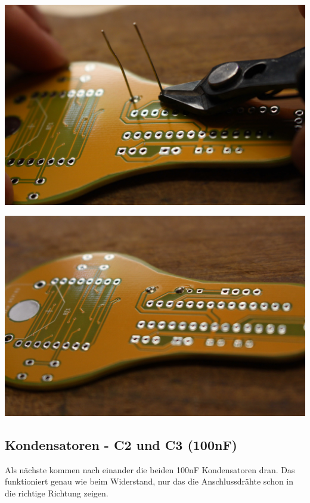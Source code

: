 \documentclass{article}
\begin{document}
\begin{minipage}[b]{0.5\textwidth}
	\includegraphics[width=\textwidth]{Bilder/IMG_5544.JPG}
	\label{fig:}
\end{minipage}
\begin{minipage}[b]{0.5\textwidth}
	\includegraphics[width=\textwidth]{Bilder/IMG_5545.JPG}
	\label{fig:}
\end{minipage}

\subsection{Kondensatoren - C2 und C3 (100nF)}

Als nächste kommen nach einander die beiden 100nF Kondensatoren dran.
Das funktioniert genau wie beim Widerstand, nur das die Anschlussdrähte schon in die richtige Richtung zeigen.
\end{document}
